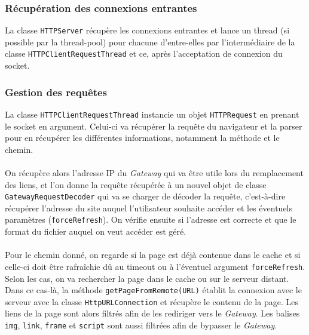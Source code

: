 \documentclass[a4paper,11pt]{article}
\begin{document}
	\subsubsection{Récupération des connexions entrantes}
La classe \texttt{HTTPServer} récupère les connexions entrantes et lance un thread (si possible par la thread-pool) pour chacune d'entre-elles par l'intermédiaire de la classe \texttt{HTTPClientRequestThread} et ce, après l'acceptation de connexion du socket.

	\subsubsection{Gestion des requêtes}
	La classe \texttt{HTTPClientRequestThread} instancie un objet \texttt{HTTPRequest} en prenant le socket en argument. Celui-ci va récupérer la requête du navigateur et la parser pour en récupérer les différentes informations, notamment la méthode et le chemin.

\paragraph{}

On récupère alors l'adresse IP du \textit{Gateway} qui va être utile lors du remplacement des liens, et l'on donne la requête récupérée à un nouvel objet de classe \texttt{GatewayRequestDecoder} qui va se charger de décoder la requête, c'est-à-dire récupérer l'adresse du site auquel l'utilisateur souhaite accéder et les éventuels paramètres (\texttt{forceRefresh}). On vérifie ensuite si l'adresse est correcte et que le format du fichier auquel on veut accéder est géré.

\paragraph{}

Pour le chemin donné, on regarde si la page est déjà contenue dans le cache et si celle-ci doit être rafraîchie dû au timeout ou à l'éventuel argument \texttt{forceRefresh}. Selon les cas, on va rechercher la page dans le cache ou sur le serveur distant. Dans ce cas-là, la méthode \texttt{getPageFromRemote(URL)} établit la connexion avec le serveur avec la classe \texttt{HttpURLConnection} et récupère le contenu de la page. Les liens de la page sont alors filtrés afin de les rediriger vers le \textit{Gateway}. Les balises \texttt{img}, \texttt{link}, \texttt{frame} et \texttt{script} sont aussi filtrées afin de bypasser le \textit{Gateway}. 
\end{document}
